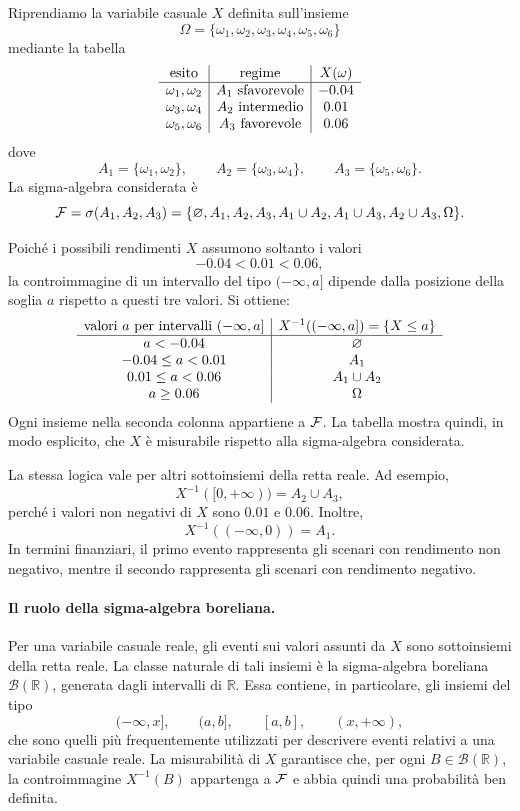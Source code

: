 \begin{example}[Controimmagini]
\par\smallskip
Riprendiamo la variabile
casuale $X$ definita sull'insieme
\[
\Omega=\{\omega_{1},\omega_{2},\omega_{3},\omega_{4},\omega_{5},\omega_{6}\}
\]
mediante la tabella
\[%
\begin{array}
[c]{c|c|c}%
\mbox{esito} & \mbox{regime} & X(\omega)\\\hline
\omega_{1},\omega_{2} & A_{1}\ \mbox{sfavorevole} & -0.04\\
\omega_{3},\omega_{4} & A_{2}\ \mbox{intermedio} & 0.01\\
\omega_{5},\omega_{6} & A_{3}\ \mbox{favorevole} & 0.06
\end{array}
\]
dove
\[
A_{1}=\{\omega_{1},\omega_{2}\}, \qquad A_{2}=\{\omega_{3},\omega_{4}\},
\qquad A_{3}=\{\omega_{5},\omega_{6}\}.
\]
La sigma-algebra considerata \`{e}
\[
\mathcal{F}=\sigma(A_{1},A_{2},A_{3}) = \{\varnothing, A_{1},A_{2},A_{3},
A_{1}\cup A_{2},A_{1}\cup A_{3},A_{2}\cup A_{3}, \Omega\}.
\]


Poich\'{e} i possibili rendimenti $X$ assumono soltanto i valori%
\[
-0.04<0.01<0.06,
\]
la controimmagine di un intervallo del tipo $(-\infty,a]$ dipende dalla
posizione della soglia $a$ rispetto a questi tre valori. Si ottiene:
\[%
\begin{array}
[c]{c|c}%
\text{valori }a\text{ per intervalli }(-\infty,a] & X^{-1}((-\infty
,a])=\{X\leq a\}\\\hline
a<-0.04 & \varnothing\\
-0.04\leq a<0.01 & A_{1}\\
0.01\leq a<0.06 & A_{1}\cup A_{2}\\
a\geq0.06 & \Omega
\end{array}
\]
Ogni insieme nella seconda colonna appartiene a $\mathcal{F}$. La tabella
mostra quindi, in modo esplicito, che $X$ \`{e} misurabile rispetto alla
sigma-algebra considerata.

La stessa logica vale per altri sottoinsiemi della retta reale. Ad esempio,
\[
X^{-1}([0,+\infty))=A_{2}\cup A_{3},
\]
perch\'{e} i valori non negativi di $X$ sono $0.01$ e $0.06$. Inoltre,
\[
X^{-1}((-\infty,0))=A_{1}.
\]
In termini finanziari, il primo evento rappresenta gli scenari con rendimento
non negativo, mentre il secondo rappresenta gli scenari con rendimento negativo.
\end{example}

\paragraph{Il ruolo della sigma-algebra boreliana.}
Per una variabile casuale reale, gli eventi sui valori assunti da $X$ sono
sottoinsiemi della retta reale. La classe naturale di tali insiemi \`{e} la
sigma-algebra boreliana $\mathcal{B}(\mathbb{R})$, generata dagli intervalli
di $\mathbb{R}$. Essa contiene, in particolare, gli insiemi del tipo
\[
(-\infty,x],
\qquad
(a,b],
\qquad
[a,b],
\qquad
(x,+\infty),
\]
che sono quelli pi\`{u} frequentemente utilizzati per descrivere eventi relativi
a una variabile casuale reale. La misurabilit\`{a} di $X$ garantisce che, per
ogni $B\in\mathcal{B}(\mathbb{R})$, la controimmagine $X^{-1}(B)$ appartenga a
$\mathcal{F}$ e abbia quindi una probabilit\`{a} ben definita.

